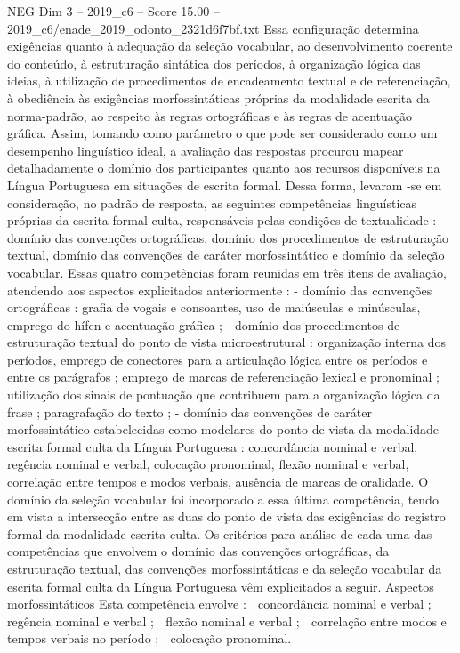 \begin{textsample}{NEG Dim 3 – 2019\_c6 – Score 15.00 – 2019\_c6/enade\_2019\_odonto\_2321d6f7bf.txt}
Essa configuração determina exigências quanto à adequação da seleção vocabular, ao desenvolvimento coerente do conteúdo, à estruturação sintática dos períodos, à organização lógica das ideias, à utilização de procedimentos de encadeamento textual e de referenciação, à obediência às exigências morfossintáticas próprias da modalidade escrita da norma-padrão, ao respeito às regras ortográficas e às regras de acentuação gráfica.
Assim, tomando como parâmetro o que pode ser considerado como um desempenho linguístico ideal, a avaliação das respostas procurou mapear detalhadamente o domínio dos participantes quanto aos recursos disponíveis na Língua Portuguesa em situações de escrita formal.
Dessa forma, levaram -se em consideração, no padrão de resposta, as seguintes competências linguísticas próprias da escrita formal culta, responsáveis pelas condições de textualidade : domínio das convenções ortográficas, domínio dos procedimentos de estruturação textual, domínio das convenções de caráter morfossintático e domínio da seleção vocabular.
Essas quatro competências foram reunidas em três itens de avaliação, atendendo aos aspectos explicitados anteriormente : - domínio das convenções ortográficas : grafia de vogais e consoantes, uso de maiúsculas e minúsculas, emprego do hífen e acentuação gráfica ; - domínio dos procedimentos de estruturação textual do ponto de vista microestrutural : organização interna dos períodos, emprego de conectores para a articulação lógica entre os períodos e entre os parágrafos ; emprego de marcas de referenciação lexical e pronominal ; utilização dos sinais de pontuação que contribuem para a organização lógica da frase ; paragrafação do texto ; - domínio das convenções de caráter morfossintático estabelecidas como modelares do ponto de vista da modalidade escrita formal culta da Língua Portuguesa : concordância nominal e verbal, regência nominal e verbal, colocação pronominal, flexão nominal e verbal, correlação entre tempos e modos verbais, ausência de marcas de oralidade.
O domínio da seleção vocabular foi incorporado a essa última competência, tendo em vista a intersecção entre as duas do ponto de vista das exigências do registro formal da modalidade escrita culta.
Os critérios para análise de cada uma das competências que envolvem o domínio das convenções ortográficas, da estruturação textual, das convenções morfossintáticas e da seleção vocabular da escrita formal culta da Língua Portuguesa vêm explicitados a seguir.
Aspectos morfossintáticos Esta competência envolve :  concordância nominal e verbal ;  regência nominal e verbal ;  flexão nominal e verbal ;  correlação entre modos e tempos verbais no período ;  colocação pronominal.

\end{textsample}
